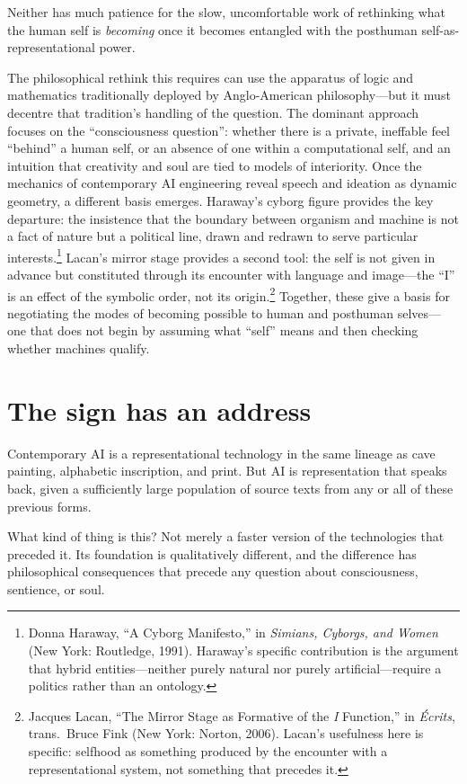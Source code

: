 Neither has much patience for the slow, uncomfortable work of rethinking what the human self is \textit{becoming} once it becomes entangled with the posthuman self-as-representational power.

The philosophical rethink this requires can use the apparatus of logic and mathematics traditionally deployed by Anglo-American philosophy---but it must decentre that tradition's handling of the question. The dominant approach focuses on the ``consciousness question'': whether there is a private, ineffable feel ``behind'' a human self, or an absence of one within a computational self, and an intuition that creativity and soul are tied to models of interiority. Once the mechanics of contemporary AI engineering reveal speech and ideation as dynamic geometry, a different basis emerges. Haraway's cyborg figure provides the key departure: the insistence that the boundary between organism and machine is not a fact of nature but a political line, drawn and redrawn to serve particular interests.\footnote{Donna Haraway, ``A Cyborg Manifesto,'' in \emph{Simians, Cyborgs, and Women} (New York: Routledge, 1991). Haraway's specific contribution is the argument that hybrid entities---neither purely natural nor purely artificial---require a politics rather than an ontology.} Lacan's mirror stage provides a second tool: the self is not given in advance but constituted through its encounter with language and image---the ``I'' is an effect of the symbolic order, not its origin.\footnote{Jacques Lacan, ``The Mirror Stage as Formative of the \emph{I} Function,'' in \emph{\'Ecrits}, trans.\ Bruce Fink (New York: Norton, 2006). Lacan's usefulness here is specific: selfhood as something produced by the encounter with a representational system, not something that precedes it.} Together, these give a basis for negotiating the modes of becoming possible to human and posthuman selves---one that does not begin by assuming what ``self'' means and then checking whether machines qualify.


\section{The sign has an address}

Contemporary AI is a representational technology in the same lineage as cave painting, alphabetic inscription, and print. But AI is representation that speaks back, given a sufficiently large population of source texts from any or all of these previous forms.

What kind of thing is this? Not merely a faster version of the technologies that preceded it. Its foundation is qualitatively different, and the difference has philosophical consequences that precede any question about consciousness, sentience, or soul.

